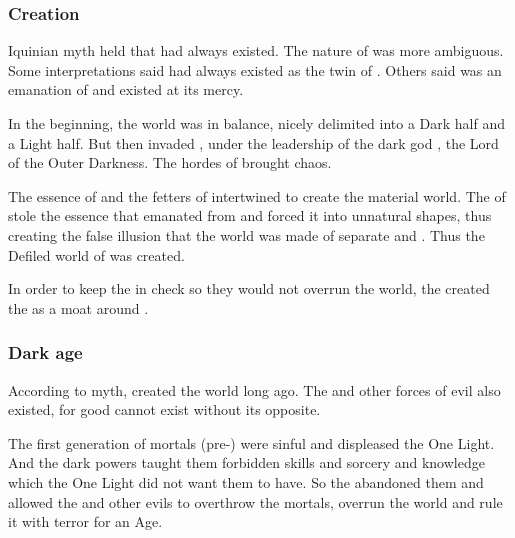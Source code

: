 \subsubsection{Creation}
Iquinian myth held that \iquin had always existed. 
The nature of \itzach was more ambiguous. 
Some interpretations said \itzach had always existed as the twin of \iquin.
Others said \itzach was an emanation of \iquin and existed at its mercy. 

In the beginning, the world was in balance, nicely delimited into a Dark half and a Light half. 
But then \itzach invaded \iquin, under the leadership of the dark god , the Lord of the Outer Darkness. 
The hordes of \itzach brought chaos. 

The essence of \iquin and the fetters of \itzach intertwined to create the material world. 
The \qliphoth of \itzach stole the essence that emanated from \iquin and forced it into unnatural shapes, thus creating the false illusion that the world was made of separate  and .
Thus the Defiled world of  was created. 

In order to keep the \qliphoth in check so they would not overrun the world, the \sephiroth created the  as a moat around \Atziluth. 





\subsubsection{Dark age}
According to myth, \Iquin created the world long ago.
The \dragons and other forces of evil also existed, for good cannot exist without its opposite.

The first generation of mortals (pre-\humans) were sinful and displeased the One Light.
And the dark powers taught them forbidden skills and sorcery and knowledge which the One Light did not want them to have. 
So the \sephiroth abandoned them and allowed the \dragons and other evils to overthrow the mortals, overrun the world and rule it with terror for an Age.


